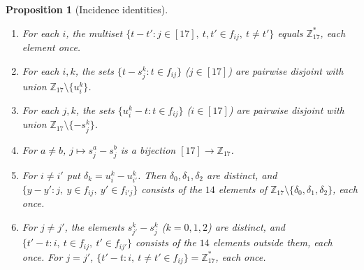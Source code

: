 \documentclass[11pt,a4paper]{article}
\newtheorem{proposition}[theorem]{Proposition}
\theoremstyle{definition}
\newcommand{\Zp}{\mathbb{Z}_{17}}
\newcommand{\Zs}{\mathbb{Z}_{17}^{*}}
\begin{document}
\begin{proposition}[Incidence identities]\label{prop:inc}
\begin{enumerate}[label=(\Roman*),itemsep=2pt]
\item For each $i$, the multiset $\{t-t': j\in[17],\ t,t'\in f_{ij},\ t\ne t'\}$ equals $\Zs$, each element once.
\item For each $i,k$, the sets $\{t-s^k_j:t\in f_{ij}\}$ ($j\in[17]$) are pairwise disjoint with union $\Zp\setminus\{u^k_i\}$.
\item For each $j,k$, the sets $\{u^k_i-t:t\in f_{ij}\}$ ($i\in[17]$) are pairwise disjoint with union $\Zp\setminus\{-s^k_j\}$.
\item For $a\ne b$, $j\mapsto s^a_j-s^b_j$ is a bijection $[17]\to\Zp$.
\item For $i\ne i'$ put $\delta_k=u^k_i-u^k_{i'}$. Then $\delta_0,\delta_1,\delta_2$ are distinct, and $\{y-y':j,\ y\in f_{ij},\ y'\in f_{i'j}\}$ consists of the $14$ elements of $\Zp\setminus\{\delta_0,\delta_1,\delta_2\}$, each once.
\item For $j\ne j'$, the elements $s^k_{j'}-s^k_j$ ($k=0,1,2$) are distinct, and $\{t'-t:i,\ t\in f_{ij},\ t'\in f_{ij'}\}$ consists of the $14$ elements outside them, each once. For $j=j'$, $\{t'-t:i,\ t\ne t'\in f_{ij}\}=\Zs$, each once.
\end{enumerate}
\end{proposition}
\end{document}
